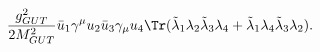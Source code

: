 \begin{equation}\label{fourthamp}
{g_{GUT}^2\over 2M_{GUT}^2} \bar u_1 \gamma^\mu u_2 \bar u_3 \gamma_\mu u_4
\Tr(\tilde \lambda_1
\lambda_2\tilde\lambda_3\lambda_4+\tilde\lambda_1\lambda_4\tilde\lambda_3\lambda_2).
\end{equation}

